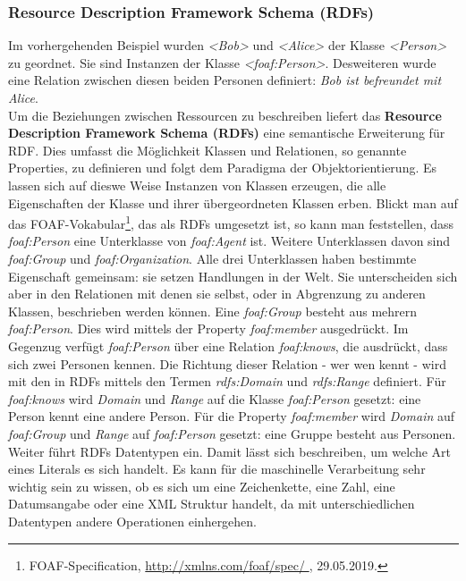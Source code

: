 \documentclass[12pt,a4paper]{article}
\begin{document}
\subsubsection{Resource Description Framework Schema (RDFs)}

Im vorhergehenden Beispiel wurden \textit{<Bob>} und \textit{<Alice>} der Klasse \textit{<Person>} zu geordnet. Sie sind Instanzen der Klasse \textit{<foaf:Person>}. Desweiteren wurde eine Relation zwischen diesen beiden Personen definiert: \textit{Bob ist befreundet mit Alice}.
\\
Um die Beziehungen zwischen Ressourcen zu beschreiben liefert das \textbf{Resource Description Framework Schema (RDFs)} eine semantische Erweiterung für RDF. Dies umfasst die Möglichkeit Klassen und Relationen, so genannte Properties, zu definieren und folgt dem Paradigma der Objektorientierung. Es lassen sich auf dieswe Weise Instanzen von Klassen erzeugen, die alle Eigenschaften der Klasse und ihrer übergeordneten Klassen erben. Blickt man auf das FOAF-Vokabular\footnote{FOAF-Specification, \protect\url{http://xmlns.com/foaf/spec/ }, 29.05.2019.}, das als RDFs umgesetzt ist, so kann man feststellen, dass \textit{foaf:Person} eine Unterklasse von \textit{foaf:Agent} ist. Weitere Unterklassen davon sind \textit{foaf:Group} und \textit{foaf:Organization}. Alle drei Unterklassen haben bestimmte Eigenschaft gemeinsam: sie setzen Handlungen in der Welt. Sie unterscheiden sich aber in den Relationen mit denen sie selbst, oder in Abgrenzung zu anderen Klassen, beschrieben werden können. Eine \textit{foaf:Group} besteht aus mehrern \textit{foaf:Person}. Dies wird mittels der Property \textit{foaf:member} ausgedrückt. Im Gegenzug verfügt \textit{foaf:Person} über eine Relation \textit{foaf:knows}, die ausdrückt, dass sich zwei Personen kennen. Die Richtung dieser Relation - wer wen kennt - wird mit den in RDFs mittels den Termen \textit{rdfs:Domain} und \textit{rdfs:Range} definiert. 
Für \textit{foaf:knows} wird \textit{Domain} und \textit{Range} auf die Klasse\textit{ foaf:Person} gesetzt: eine Person kennt eine andere Person. Für die Property \textit{foaf:member} wird \textit{Domain} auf \textit{foaf:Group} und \textit{Range} auf \textit{foaf:Person} gesetzt: eine Gruppe besteht aus Personen.
\\
Weiter führt RDFs Datentypen ein. Damit lässt sich beschreiben, um welche Art eines Literals es sich handelt. Es kann für die maschinelle Verarbeitung sehr wichtig sein zu wissen, ob es sich um eine Zeichenkette, eine Zahl, eine Datumsangabe oder eine XML Struktur handelt, da mit unterschiedlichen Datentypen andere Operationen einhergehen. 
\end{document}

